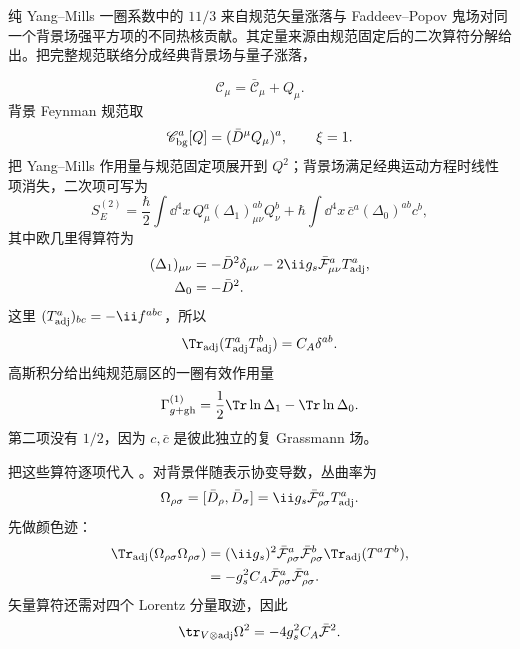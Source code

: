 \begin{derivation}[胶子与鬼场的一圈紫外系数]
纯 Yang--Mills 一圈系数中的 $11/3$ 来自规范矢量涨落与 Faddeev--Popov 鬼场对同一个背景场强平方项的不同热核贡献。其定量来源由规范固定后的二次算符分解给出。把完整规范联络分成经典背景场与量子涨落，

\begin{equation*}
 \mathscr C_\mu=\bar{\mathscr C}_\mu+Q_\mu.
\end{equation*}
背景 Feynman 规范取
\begin{equation*}
 \mathscr C_{\rm bg}^a[Q]=(\bar D^\mu Q_\mu)^a,
 \qquad\xi=1.
\end{equation*}
把 Yang--Mills 作用量与规范固定项展开到 $Q^2$；背景场满足经典运动方程时线性项消失，二次项可写为
\begin{equation*}
 S_E^{(2)}
 =\frac\hbar2\int\dd^4 x\,
 Q_\mu^a(\Delta_1)_{\mu\nu}^{ab}Q_\nu^b
 +\hbar\int\dd^4 x\,
 \bar c^a(\Delta_0)^{ab}c^b,
\end{equation*}
其中欧几里得算符为
\begin{align*}
 (\Delta_1)_{\mu\nu}
 &=-\bar D^2\delta_{\mu\nu}
 -2\ii g_s\bar{\mathcal F}_{\mu\nu}^aT_{\rm adj}^a,\\
 \Delta_0&=-\bar D^2.
\end{align*}
这里 $(T_{\rm adj}^a)_{bc}=-\ii f^{abc}$，所以
\begin{equation*}
 \Tr_{\rm adj}(T_{\rm adj}^aT_{\rm adj}^b)
 =C_A\delta^{ab}.
\end{equation*}
高斯积分给出纯规范扇区的一圈有效作用量
\begin{equation*}
 \Gamma_{g+\rm gh}^{(1)}
 =\frac12\Tr\ln\Delta_1-\Tr\ln\Delta_0.
\end{equation*}
第二项没有 $1/2$，因为 $c,\bar c$ 是彼此独立的复 Grassmann 场。

把这些算符逐项代入 。对背景伴随表示协变导数，丛曲率为
\begin{equation*}
 \Omega_{\rho\sigma}
 =[\bar D_\rho,\bar D_\sigma]
 =\ii g_s\bar{\mathcal F}_{\rho\sigma}^aT_{\rm adj}^a.
\end{equation*}
先做颜色迹：
\begin{align*}
 \Tr_{\rm adj}(\Omega_{\rho\sigma}\Omega_{\rho\sigma})
 &=(\ii g_s)^2
 \bar{\mathcal F}_{\rho\sigma}^a\bar{\mathcal F}_{\rho\sigma}^b
 \Tr_{\rm adj}(T^aT^b),\\
 &=-g_s^2C_A\bar{\mathcal F}_{\rho\sigma}^a
 \bar{\mathcal F}_{\rho\sigma}^a.
\end{align*}
矢量算符还需对四个 Lorentz 分量取迹，因此
\begin{equation*}
 \tr_{V\otimes\rm adj}\Omega^2
 =-4g_s^2C_A\bar{\mathcal F}^2.
\end{equation*}


\end{derivation}
